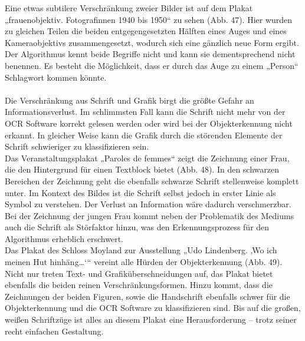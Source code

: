 \documentclass[a4paper,12pt,ngerman]{article}
\begin{document}
Eine etwas subtilere Verschränkung zweier Bilder ist auf dem Plakat „frauenobjektiv. Fotografinnen 1940 bis 1950“ zu sehen (Abb. 47). Hier wurden zu gleichen Teilen die beiden entgegengesetzten Hälften eines Auges und eines Kameraobjektivs zusammengesetzt, wodurch sich eine gänzlich neue Form ergibt. Der Algorithmus kennt beide Begriffe nicht und kann sie dementsprechend nicht benennen. Es besteht die Möglichkeit, dass er durch das Auge zu einem „Person“ Schlagwort kommen könnte. \\
\\
Die Verschränkung aus Schrift und Grafik birgt die größte Gefahr an Informationsverlust. Im schlimmsten Fall kann die Schrift nicht mehr von der OCR Software korrekt gelesen werden oder wird bei der Objekterkennung nicht erkannt. In gleicher Weise kann die Grafik durch die störenden Elemente der Schrift schwieriger zu klassifizieren sein.\\
Das Veranstaltungsplakat „Paroles de femmes“ zeigt die Zeichnung einer Frau, die den Hintergrund für einen Textblock bietet (Abb. 48). In den schwarzen Bereichen der Zeichnung geht die ebenfalls schwarze Schrift stellenweise komplett unter. Im Kontext des Bildes ist die Schrift selbst jedoch in erster Linie als Symbol zu verstehen. Der Verlust an Information wäre dadurch verschmerzbar. Bei der Zeichnung der jungen Frau kommt neben der Problematik des Mediums auch die Schrift als Störfaktor hinzu, was den Erkennungsprozess für den Algorithmus erheblich erschwert.\\
Das Plakat des Schloss Moyland zur Ausstellung „Udo Lindenberg. ‚Wo ich meinen Hut hinhäng…‘“ vereint alle Hürden der Objekterkennung (Abb. 49). Nicht nur treten Text- und Grafiküberschneidungen auf, das Plakat bietet ebenfalls die beiden reinen Verschränkungsformen. Hinzu kommt, dass die Zeichnungen der beiden Figuren, sowie die Handschrift ebenfalls schwer für die Objekterkennung und die OCR Software zu klassifizieren sind. Bis auf die großen, weißen Schriftzüge ist alles an diesem Plakat eine Herausforderung -- trotz seiner recht einfachen Gestaltung.
\end{document}
